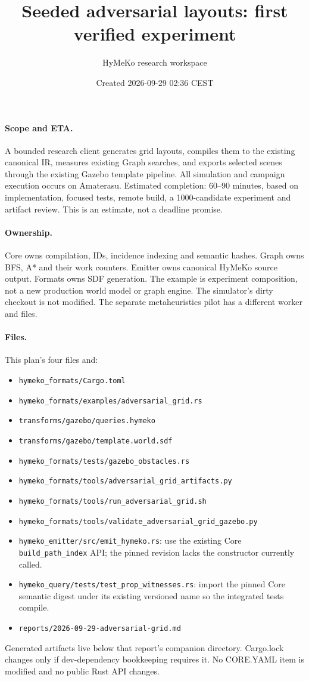 \documentclass[11pt,a4paper]{article}
\title{Seeded adversarial layouts: first verified experiment}
\author{HyMeKo research workspace}
\date{Created 2026-09-29 02:36 CEST}
\begin{document}
\maketitle
\paragraph{Scope and ETA.} A bounded research client generates grid layouts, compiles
them to the existing canonical IR, measures existing Graph searches, and exports
selected scenes through the existing Gazebo template pipeline. All simulation and
campaign execution occurs on Amaterasu. Estimated completion: 60--90 minutes, based
on implementation, focused tests, remote build, a 1000-candidate experiment and
artifact review. This is an estimate, not a deadline promise.
\paragraph{Ownership.} Core owns compilation, IDs, incidence indexing and semantic
hashes. Graph owns BFS, A* and their work counters. Emitter owns canonical HyMeKo
source output. Formats owns SDF generation. The example is experiment composition,
not a new production world model or graph engine. The simulator's dirty checkout
is not modified. The separate metaheuristics pilot has a different worker and files.
\paragraph{Files.} This plan's four files and:
\begin{itemize}
\item \texttt{hymeko\_formats/Cargo.toml}
\item \texttt{hymeko\_formats/examples/adversarial\_grid.rs}
\item \texttt{transforms/gazebo/queries.hymeko}
\item \texttt{transforms/gazebo/template.world.sdf}
\item \texttt{hymeko\_formats/tests/gazebo\_obstacles.rs}
\item \texttt{hymeko\_formats/tools/adversarial\_grid\_artifacts.py}
\item \texttt{hymeko\_formats/tools/run\_adversarial\_grid.sh}
\item \texttt{hymeko\_formats/tools/validate\_adversarial\_grid\_gazebo.py}
\item \texttt{hymeko\_emitter/src/emit\_hymeko.rs}: use the existing Core
\texttt{build\_path\_index} API; the pinned revision lacks the constructor currently called.
\item \texttt{hymeko\_query/tests/test\_prop\_witnesses.rs}: import the pinned
Core semantic digest under its existing versioned name so the integrated tests compile.
\item \texttt{reports/2026-09-29-adversarial-grid.md}
\end{itemize}
Generated artifacts live below that
report's companion directory. Cargo.lock changes only if dev-dependency bookkeeping
requires it. No CORE.YAML item is modified and no public Rust API changes.
\end{document}
